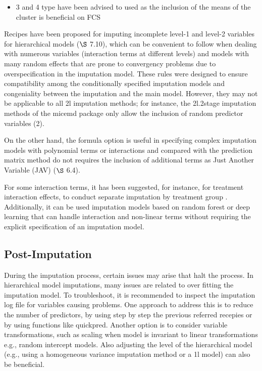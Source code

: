 \documentclass[
  article]{jss}
\providecommand{\tightlist}{%
  \setlength{\itemsep}{0pt}\setlength{\parskip}{0pt}}\usepackage{longtable,booktabs,array}
\begin{document}
\begin{itemize}
\tightlist
\item
  3 and 4 type have been advised to used as the inclusion of the means
  of the cluster is beneficial on FCS \cite{mistler2017}
\end{itemize}

Recipes have been proposed for imputing incomplete level-1 and level-2
variables for hierarchical models \cite{buuren2018a} (\(\S\) 7.10),
which can be convenient to follow when dealing with numerous variables
(interaction terms at different levels) and models with many random
effects that are prone to convergency problems due to overspecification
in the imputation model. These rules were designed to ensure
compatibility among the conditionally specified imputation models and
congeniality between the imputation and the main model. However, they
may not be applicable to all 2l imputation methods; for instance, the
2l.2stage imputation methods of the micemd package only allow the
inclusion of random predictor variables (2).

On the other hand, the formula option is useful in specifying complex
imputation models with polynomial terms or interactions and compared
with the prediction matrix method do not requires the inclusion of
additional terms as Just Another Variable (JAV)
\cite{buuren2018a}(\(\S\) 6.4).

For some interaction terms, it has been suggested, for instance, for
treatment interaction effects, to conduct separate imputation by
treatment group \cite{zhang2023}. Additionally, it can be used
imputation models based on random forest or deep learning that can
handle interaction and non-linear terms without requiring the explicit
specification of an imputation model.

\hypertarget{post-imputation}{%
\subsection{Post-Imputation}\label{post-imputation}}

During the imputation process, certain issues may arise that halt the
process. In hierarchical model imputations, many issues are related to
over fitting the imputation model. To troubleshoot, it is recommended to
inspect the imputation log file for variables causing problems. One
approach to address this is to reduce the number of predictors, by using
step by step the previous referred recepies or by using functions like
quickpred. Another option is to consider variable transformations, such
as scaling when model is invariant to linear transformations e.g.,
random intercept models. Also adjusting the level of the hierarchical
model (e.g., using a homogeneous variance imputation method or a 1l
model) can also be beneficial.
\end{document}

